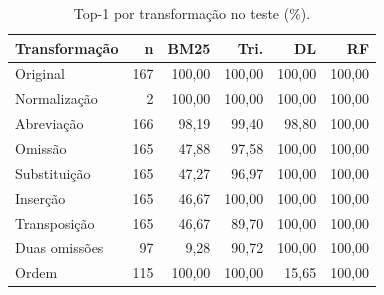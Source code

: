 \begin{table}[tb]
\caption{Top-1 por transformação no teste (\%).}
\label{tab:tipos}
\centering
\small
\setlength{\tabcolsep}{3pt}
\begin{tabular}{lrrrrr}
\toprule
Transformação & n & BM25 & Tri. & DL & RF \\
\midrule
Original & 167 & 100,00 & 100,00 & 100,00 & 100,00 \\
Normalização & 2 & 100,00 & 100,00 & 100,00 & 100,00 \\
Abreviação & 166 & 98,19 & 99,40 & 98,80 & 100,00 \\
Omissão & 165 & 47,88 & 97,58 & 100,00 & 100,00 \\
Substituição & 165 & 47,27 & 96,97 & 100,00 & 100,00 \\
Inserção & 165 & 46,67 & 100,00 & 100,00 & 100,00 \\
Transposição & 165 & 46,67 & 89,70 & 100,00 & 100,00 \\
Duas omissões & 97 & 9,28 & 90,72 & 100,00 & 100,00 \\
Ordem & 115 & 100,00 & 100,00 & 15,65 & 100,00 \\
\bottomrule
\end{tabular}
\par{}
\end{table}
